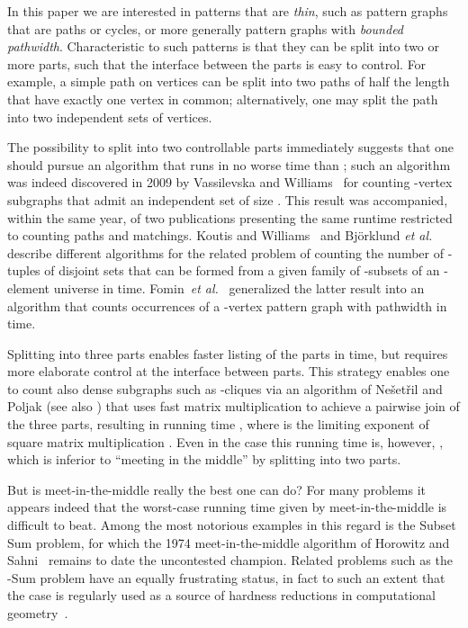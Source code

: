 \documentclass{amsart}
\begin{document}
In this paper we are interested in patterns that are {\em thin}, such 
as pattern graphs that are paths or cycles, or more generally pattern graphs 
with {\em bounded pathwidth}. Characteristic to such patterns is 
that they can be split into two or more parts, such that the interface 
between the parts is easy to control. For example, a simple path on  
vertices can be split into two paths of half the length that have exactly 
one vertex in common; alternatively, one may split the path into 
two independent sets of vertices.

The possibility to split into two controllable parts immediately suggests 
that one should pursue an algorithm that runs in no worse 
time than ; such an algorithm was indeed 
discovered in 2009 by Vassilevska and Williams~\cite{VW09} for 
counting -vertex subgraphs that admit an independent set of size .
This result was accompanied, within the same year, of two publications 
presenting the same runtime restricted to counting paths and matchings. Koutis 
and Williams~\cite{KW09} and Bj\"orklund \emph{et al.}~\cite{BHKK09} 
describe different algorithms for the related problem of counting 
the number of -tuples of disjoint sets that can be formed from
a given family of -subsets of an -element universe in 
 time. Fomin~\emph{et al.}~\cite{FLRRS12} 
generalized the latter result into an algorithm that counts occurrences 
of a -vertex pattern graph with pathwidth  in  time.

Splitting into three parts enables faster listing of the parts in 
 time, but requires more elaborate control at the interface 
between parts. This strategy enables one to count also dense subgraphs
such as -cliques via an algorithm of Ne\v{s}et\v{r}il and 
Poljak \cite{NP85} (see also \cite{EG04,KKM00}) that uses fast
matrix multiplication to achieve a pairwise join of the three parts, 
resulting in running time , where 
 is the limiting exponent of square matrix 
multiplication \cite{LG14,VW12}.
Even in the case  this running time is, however, 
, which is inferior to ``meeting in the middle'' by 
splitting into two parts.

But is meet-in-the-middle really the best one can do?
For many problems it appears indeed that the worst-case running time given 
by meet-in-the-middle is difficult to beat. Among the most notorious examples 
in this regard is the Subset Sum problem, for which the 1974 
meet-in-the-middle algorithm of Horowitz and Sahni~\cite{HS74} remains to 
date the uncontested champion. Related problems such as the -Sum problem 
have an equally frustrating status, in fact to such an extent that the 
case  is regularly used as a source of hardness reductions in 
computational geometry~\cite{GO12}.
\end{document}
